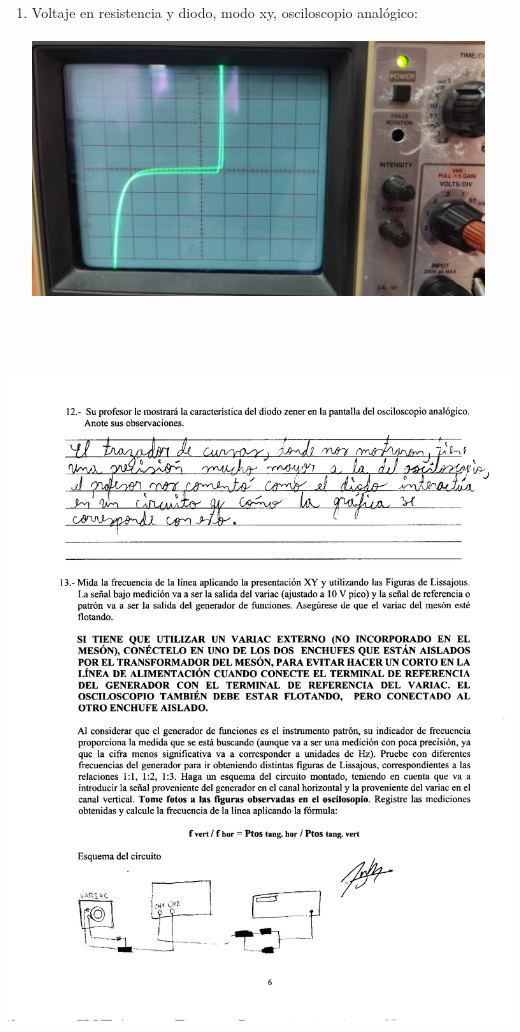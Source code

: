 \documentclass[12pt]{article}
\begin{document}
\begin{enumerate}
		\item Voltaje en resistencia y diodo, modo xy, osciloscopio analógico:
		
		\includegraphics[width=12cm,height=7cm]{Img/lab_5_img_10}
		
	\end{enumerate}	
	
	\begin{center}
		\includegraphics[width=16cm,height=20cm]{Img/anexo_0004}
	\end{center}
	
\end{document}
